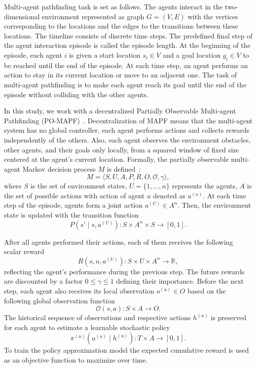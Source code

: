 \documentclass{article} %
\begin{document}
Multi-agent pathfinding task is set as follows. The agents interact in the two-dimensional environment represented as graph $G = (V, E)$ with the vertices corresponding to the locations and the edges to the transitions between these locations. The timeline consists of discrete time steps. The predefined final step of the agent interaction episode is called the episode length. At the beginning of the episode, each agent $i$ is given a start location $s_i \in V$ and a goal location $g_i \in V$ to be reached until the end of the episode. At each time step, an agent performs an action to stay in its current location or move to an adjacent one. The task of multi-agent pathfinding is to make each agent reach its goal until the end of the episode without colliding with the other agents.

In this study, we work with a decentralized Partially Observable Multi-agent Pathfinding (PO-MAPF)~\citep{stern2019multi}. Decentralization of MAPF means that the multi-agent system has no global controller, each agent performs actions and collects rewards independently of the others. Also, each agent observes the environment obstacles, other agents, and their goals only locally, from a squared window of fixed size centered at the agent's current location. Formally, the partially observable multi-agent Markov decision process $M$ is defined~\citep{bernstein2002complexity}:
\[
M = \langle S, U, A, P, R, O, \mathcal{O}, \gamma\rangle,
\]
where $S$ is the set of environment states, $U = \{ 1, \ldots, n \}$ represents the agents, $A$ is the set of possible actions with action of agent $u$ denoted as $a^{(u)}$. At each time step of the episode, agents form a joint action $a^{(U)} \in A^n$. Then, the environment state is updated with the transition function 
\[
P(s' \mid s, a^{(U)}) : S \times A^n \times S \rightarrow [0, 1].
\]

After all agents performed their actions, each of them receives the following scalar reward 
\[
R(s, u, a^{(U)}) : S \times U \times A^n \rightarrow \mathbb{R},
\]
reflecting the agent's performance during the previous step. The future rewards are discounted by a factor $0 \leq \gamma \leq 1$ defining their importance. Before the next step, each agent also receives its local observation $o^{(u)} \in O$ based on the following global observation function 
\[
\mathcal{O}(s, a) : S \times A \rightarrow O.
\]
The historical sequence of observations and respective actions $h^{(u)}$ is preserved for each agent to estimate a learnable stochastic policy 
\[
\pi^{(u)}(a^{(u)} \mid h^{(u)}) : T \times A \rightarrow [0, 1].
\]
To train the policy approximation model the expected cumulative reward is used as an objective function to maximize over time.
\end{document}

